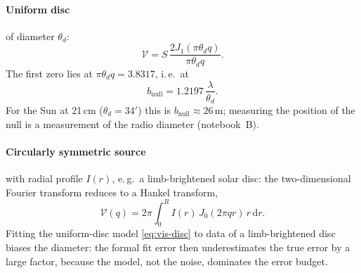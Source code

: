 \paragraph*{Uniform disc} of diameter $\theta_d$:
\begin{equation}
  \mathcal V = S\,\frac{2J_1(\pi\theta_d q)}{\pi\theta_d q} .
  \label{eq:vis-disc}
\end{equation}
The first zero lies at $\pi\theta_d q = 3.8317$, i.\,e.\ at
\begin{equation}
  b_{\mathrm{null}} = 1.2197\,\frac{\lambda}{\theta_d} .
\end{equation}
For the Sun at 21\,cm ($\theta_d = 34'$) this is $b_{\mathrm{null}}
\approx 26\,\mathrm{m}$; measuring the position of the null is a
measurement of the radio diameter (notebook~B).

\paragraph*{Circularly symmetric source} with radial profile $I(r)$,
e.\,g.\ a limb-brightened solar disc: the two-dimensional Fourier
transform reduces to a Hankel transform,
\begin{equation}
  \mathcal V(q) = 2\pi\int_0^{R} I(r)\,J_0(2\pi q r)\,r\,\mathrm{d}r .
\end{equation}
Fitting the uniform-disc model \eqref{eq:vis-disc} to data of a
limb-brightened disc biases the diameter: the formal fit error then
underestimates the true error by a large factor, because the model, not
the noise, dominates the error budget.
